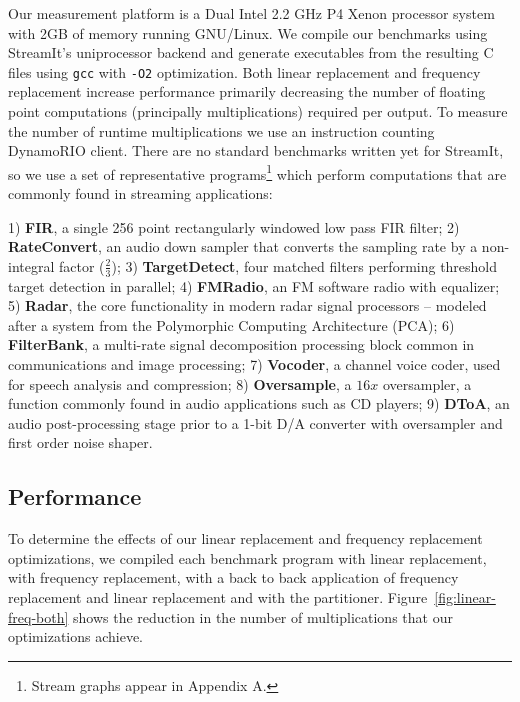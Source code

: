 Our measurement platform is a Dual Intel 2.2 GHz P4 Xenon processor system 
with 2GB of memory running GNU/Linux. We compile our benchmarks using StreamIt's uniprocessor backend
and generate executables from the resulting C files using {\tt gcc} with {\tt -O2} optimization.
Both linear replacement and frequency replacement increase performance primarily
decreasing the number of floating point computations (principally multiplications) 
required per output.
To measure the number of runtime multiplications we use an instruction counting 
DynamoRIO\cite{dynamo99} client.
There are no standard benchmarks written yet for StreamIt, so we use
a set of representative programs\footnote{Stream graphs appear in Appendix A.}
which perform computations that are commonly found in streaming applications: 

1) {\bf FIR}, a single 256 point rectangularly windowed low pass FIR filter; 
2) {\bf RateConvert}, an audio down sampler that converts the 
sampling rate by a non-integral factor ($\frac{2}{3}$); 
3) {\bf TargetDetect}, four matched filters performing threshold target detection in parallel; 
4) {\bf FMRadio}, an FM software radio with equalizer;
5) {\bf Radar}, the core functionality in modern radar signal processors 
-- modeled after a system from the Polymorphic Computing Architecture (PCA);
6) {\bf FilterBank}, a multi-rate signal decomposition 
processing block common in communications and image processing; 
7) {\bf Vocoder}, a channel voice coder, used for speech analysis and compression;
8) {\bf Oversample}, a $16x$ oversampler, a function commonly found in audio applications 
such as CD players;
9) {\bf DToA}, an audio post-processing stage prior to a 1-bit D/A converter 
with oversampler and first order noise shaper.

\subsection{Performance}
To determine the effects of our linear replacement and frequency
replacement optimizations, we compiled each benchmark program with
linear replacement, with frequency replacement, with a back to back application of
frequency replacement and linear replacement and with the partitioner.
Figure~\ref{fig:linear-freq-both} shows the reduction in the number
of multiplications that our optimizations achieve.


